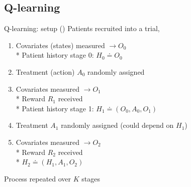 \documentclass{beamer}
\begin{document}
\subsection{Q-learning} %
\label{sub:q_learning}

\begin{frame}{Q-learning: setup (\cite{dtr-review})}
  Patients recruited into a trial,
  \begin{enumerate}[<+(1)->]
    \item Covariates (states) measured $\rightarrow O_{0}$ \\*
    Patient history stage 0: $H_{0} \doteq O_{0}$
    \item Treatment (action) $A_{0}$ randomly assigned
    \item Covariates measured $\rightarrow O_{1}$ \\*
    Reward $R_{1}$ received \\*
    Patient history stage 1: $H_{1} \doteq (O_{0}, A_{0}, O_{1})$
    \item Treatment $A_{1}$ randomly assigned (could depend on $H_{1}$)
    \item Covariates measured $\rightarrow O_{2}$ \\*
    Reward $R_{2}$ received \\*
    $H_{2} \doteq (H_{1}, A_{1}, O_{2})$
  \end{enumerate}
    \pause
    Process repeated over $K$ stages
\end{frame}
\end{document}
